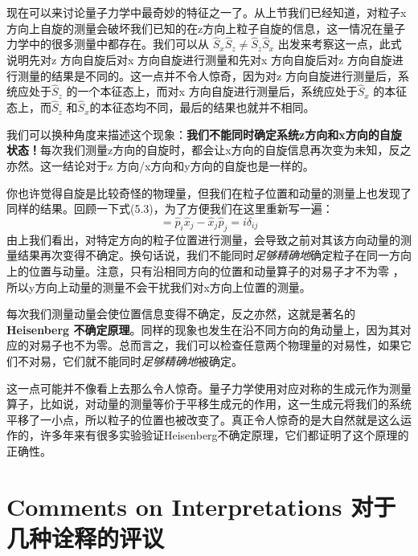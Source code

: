 现在可以来讨论量子力学中最奇妙的特征之一了。从上节我们已经知道，对粒子x方向上自旋的测量会破坏我们已知的在z方向上粒子自旋的信息，这一情况在量子力学中的很多测量中都存在。我们可以从 $\hat S_x \hat S_z \ne \hat S_z \hat S_x$ 出发来考察这一点，此式说明先对z 方向自旋后对x 方向自旋进行测量和先对x 方向自旋后对z 方向自旋进行测量的结果是不同的。这一点并不令人惊奇，因为对z 方向自旋进行测量后，系统应处于$\hat S_z$ 的一个本征态上，而对x 方向自旋进行测量后，系统应处于$\hat S_x$ 的本征态上，而$\hat S_z$ 和$\hat S_x$的本征态均不同，最后的结果也就并不相同。
\par
我们可以换种角度来描述这个现象：\textbf{我们不能同时确定系统z方向和x方向的自旋状态！}每次我们测量z方向的自旋时，都会让x方向的自旋信息再次变为未知，反之亦然。这一结论对于z 方向/x方向和y方向的自旋也是一样的。
\par
你也许觉得自旋是比较奇怪的物理量，但我们在粒子位置和动量的测量上也发现了同样的结果。回顾一下式(5.3)，为了方便我们在这里重新写一遍：
\begin{equation}
[\hat p_i,\hat x_j]=\hat p_i \hat x_j - \hat x_j \hat p_j =i \delta_{ij}
\end{equation}
由上我们看出，对特定方向的粒子位置进行测量，会导致之前对其该方向动量的测量结果再次变得不确定。换句话说，我们不能同时{\it 足够精确地}确定粒子在同一方向上的位置与动量。注意，只有沿相同方向的位置和动量算子的对易子才不为零
，所以y方向上动量的测量不会干扰我们对x方向上位置的测量。
\par
每次我们测量动量会使位置信息变得不确定，反之亦然，这就是著名的\textbf{Heisenberg 不确定原理}。同样的现象也发生在沿不同方向的角动量上，因为其对应的对易子也不为零。总而言之，我们可以检查任意两个物理量的对易性，如果它们不对易，它们就不能同时{\it 足够精确地}被确定。
\par
这一点可能并不像看上去那么令人惊奇。量子力学使用对应对称的生成元作为测量算子，比如说，对动量的测量等价于平移生成元的作用，这一生成元将我们的系统平移了一小点，所以粒子的位置也被改变了。真正令人惊奇的是大自然就是这么运作的，许多年来有很多实验验证Heisenberg不确定原理，它们都证明了这个原理的正确性。

\section[对于几种诠释的评议]{Comments on Interpretations 对于几种诠释的评议}\label{sec8.7}
